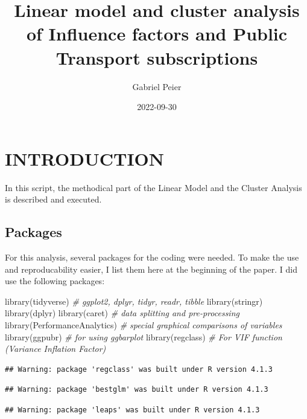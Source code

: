 \documentclass[
]{article}
\title{Linear model and cluster analysis of Influence factors and Public
Transport subscriptions}
\author{Gabriel Peier}
\date{2022-09-30}
\newenvironment{Shaded}{\begin{snugshade}}{\end{snugshade}}
\newcommand{\CommentTok}[1]{\textcolor[rgb]{0.56,0.35,0.01}{\textit{#1}}}
\newcommand{\FunctionTok}[1]{\textcolor[rgb]{0.00,0.00,0.00}{#1}}
\newcommand{\NormalTok}[1]{#1}
\begin{document}
\maketitle

\hypertarget{introduction}{%
\section{INTRODUCTION}\label{introduction}}

In this script, the methodical part of the Linear Model and the Cluster
Analysis is described and executed.

\hypertarget{packages}{%
\subsection{Packages}\label{packages}}

For this analysis, several packages for the coding were needed. To make
the use and reproducability easier, I list them here at the beginning of
the paper. I did use the following packages:

\begin{Shaded}
\begin{Highlighting}[]
\FunctionTok{library}\NormalTok{(tidyverse)             }\CommentTok{\# ggplot2, dplyr, tidyr, readr, tibble}
\FunctionTok{library}\NormalTok{(stringr)}
\FunctionTok{library}\NormalTok{(dplyr)}
\FunctionTok{library}\NormalTok{(caret)                 }\CommentTok{\# data splitting and pre{-}processing}
\FunctionTok{library}\NormalTok{(PerformanceAnalytics)  }\CommentTok{\# special graphical comparisons of variables}
\FunctionTok{library}\NormalTok{(ggpubr)                }\CommentTok{\# for using ggbarplot}
\FunctionTok{library}\NormalTok{(regclass)              }\CommentTok{\# For VIF function (Variance Inflation Factor)}
\end{Highlighting}
\end{Shaded}

\begin{verbatim}
## Warning: package 'regclass' was built under R version 4.1.3
\end{verbatim}

\begin{verbatim}
## Warning: package 'bestglm' was built under R version 4.1.3
\end{verbatim}

\begin{verbatim}
## Warning: package 'leaps' was built under R version 4.1.3
\end{verbatim}
\end{document}
